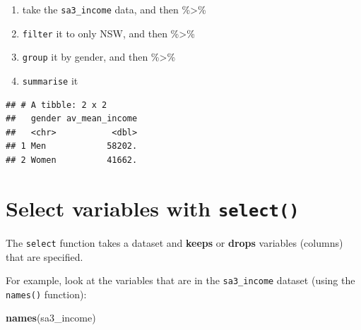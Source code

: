 \documentclass[]{book}
\newenvironment{Shaded}{\begin{snugshade}}{\end{snugshade}}
\newcommand{\CommentTok}[1]{\textcolor[rgb]{0.56,0.35,0.01}{\textit{#1}}}
\newcommand{\DataTypeTok}[1]{\textcolor[rgb]{0.13,0.29,0.53}{#1}}
\newcommand{\KeywordTok}[1]{\textcolor[rgb]{0.13,0.29,0.53}{\textbf{#1}}}
\newcommand{\NormalTok}[1]{#1}
\newcommand{\OperatorTok}[1]{\textcolor[rgb]{0.81,0.36,0.00}{\textbf{#1}}}
\newcommand{\StringTok}[1]{\textcolor[rgb]{0.31,0.60,0.02}{#1}}
\providecommand{\tightlist}{%
  \setlength{\itemsep}{0pt}\setlength{\parskip}{0pt}}
\begin{document}
\begin{enumerate}
\def\labelenumi{\arabic{enumi}.}
\tightlist
\item
  take the \texttt{sa3\_income} data, and then \%\textgreater{}\%
\item
  \texttt{filter} it to only NSW, and then \%\textgreater{}\%
\item
  \texttt{group} it by gender, and then \%\textgreater{}\%
\item
  \texttt{summarise} it
\end{enumerate}

\begin{Shaded}
\end{Shaded}

\begin{verbatim}
## # A tibble: 2 x 2
##   gender av_mean_income
##   <chr>           <dbl>
## 1 Men            58202.
## 2 Women          41662.
\end{verbatim}

\hypertarget{select-variables-with-select}{%
\section{\texorpdfstring{Select variables with \texttt{select()}}{Select variables with select()}}\label{select-variables-with-select}}

The \texttt{select} function takes a dataset and \textbf{keeps} or \textbf{drops} variables (columns) that are specified.

For example, look at the variables that are in the \texttt{sa3\_income} dataset (using the \texttt{names()} function):

\begin{Shaded}
\begin{Highlighting}[]
\KeywordTok{names}\NormalTok{(sa3_income)}
\end{Highlighting}
\end{Shaded}
\end{document}
